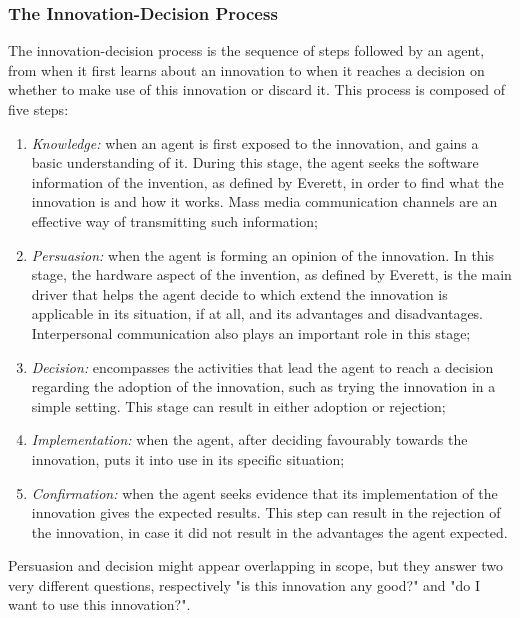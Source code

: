 \documentclass[12pt]{article}
\begin{document}
\subsubsection{The Innovation-Decision Process}
\label{sec:orge8d82a0}
The innovation-decision process is the sequence of steps followed by an agent, from when it first learns about an innovation to when it reaches a decision on whether to make use of this innovation or discard it. This process is composed of five steps:

\begin{enumerate}
\item \emph{Knowledge:} when an agent is first exposed to the innovation, and gains a basic understanding of it. During this stage, the agent seeks the software information of the invention, as defined by Everett, in order to find what the innovation is and how it works. Mass media communication channels are an effective way of transmitting such information;
\item \emph{Persuasion:} when the agent is forming an opinion of the innovation. In this stage, the hardware aspect of the invention, as defined by Everett, is the main driver that helps the agent decide to which extend the innovation is applicable in its situation, if at all, and its advantages and disadvantages. Interpersonal communication also plays an important role in this stage;
\item \emph{Decision:} encompasses the activities that lead the agent to reach a decision regarding the adoption of the innovation, such as trying the innovation in a simple setting. This stage can result in either adoption or rejection;
\item \emph{Implementation:} when the agent, after deciding favourably towards the innovation, puts it into use in its specific situation;
\item \emph{Confirmation:} when the agent seeks evidence that its implementation of the innovation gives the expected results. This step can result in the rejection of the innovation, in case it did not result in the advantages the agent expected.
\end{enumerate}

Persuasion and decision might appear overlapping in scope, but they answer two very different questions, respectively "is this innovation any good?" and "do I want to use this innovation?".
\end{document}
